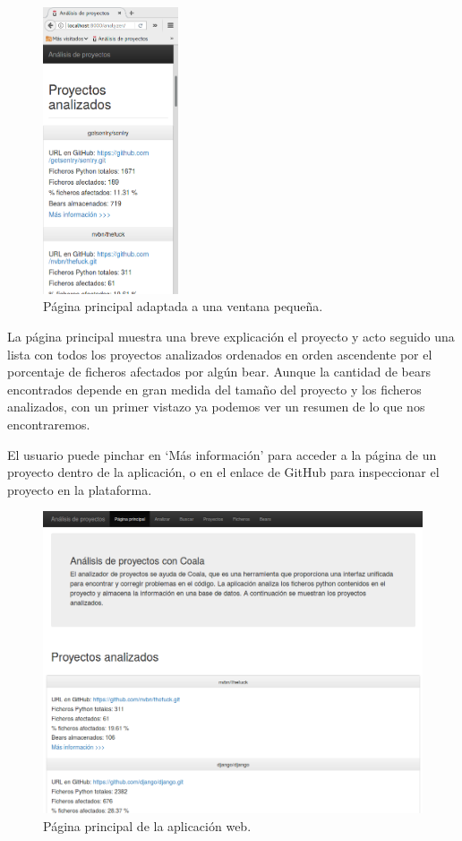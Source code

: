 \documentclass[a4paper, 12pt]{book}
\begin{document}
\begin{figure}[H]
  \centering
  \includegraphics[width=4cm, keepaspectratio]{img/webAdaptativa}
  \caption{Página principal adaptada a una ventana pequeña.}
  \label{fig:webAdaptativa}
\end{figure}

La página principal muestra una breve explicación el proyecto y acto seguido una lista con todos los proyectos analizados ordenados en orden ascendente por el porcentaje de ficheros afectados por algún bear. Aunque la cantidad de bears encontrados depende en gran medida del tamaño del proyecto y los ficheros analizados, con un primer vistazo ya podemos ver un resumen de lo que nos encontraremos.

El usuario puede pinchar en `Más información' para acceder a la página de un proyecto dentro de la aplicación, o en el enlace de GitHub para inspeccionar el proyecto en la plataforma.

\begin{figure}[H]
  \centering
  \includegraphics[width=16cm, keepaspectratio]{img/homePage}
  \caption{Página principal de la aplicación web.}
  \label{fig:homePage}
\end{figure}
\end{document}
